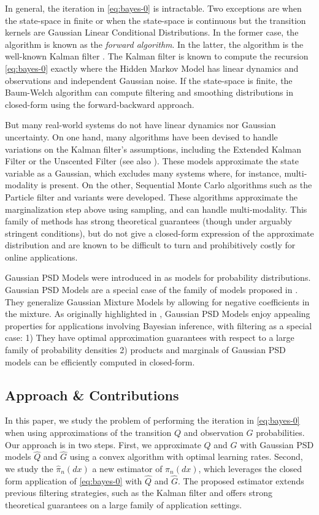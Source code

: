 In general, the iteration in \cref{eq:bayes-0} is intractable. Two exceptions are when the state-space in finite or when the state-space is continuous but the transition kernels are Gaussian Linear Conditional Distributions. In the former case, the algorithm is known as the \textit{forward algorithm}. In the latter, the algorithm is the well-known Kalman filter \cite{kalman-bucy}. The Kalman filter is known to compute the recursion \cref{eq:bayes-0} exactly where the Hidden Markov Model has linear dynamics and observations and independent Gaussian noise.
If the state-space is finite, the Baum-Welch algorithm can compute filtering and smoothing distributions in closed-form using the forward-backward approach.

But many real-world systems do not have linear dynamics nor Gaussian uncertainty. On one hand, many algorithms have been devised to handle variations on the Kalman filter's assumptions, including the Extended Kalman Filter or the Unscented Filter \citep{ukf} (see also \cite{sarkka}). These models approximate the state variable as a Gaussian, which excludes many systems where, for instance, multi-modality is present. On the other, Sequential Monte Carlo algorithms such as the Particle filter and variants were developed. These algorithms approximate the marginalization step above using sampling, and can handle multi-modality. This family of methods has strong theoretical guarantees (though under arguably stringent conditions), but do not give a closed-form expression of the approximate distribution and are known to be difficult to turn and prohibitively costly for online applications.

Gaussian PSD Models were introduced in \cite{ciliberto2021} as models for probability distributions. Gaussian PSD Models are a special case of the family of models proposed in \cite{ulysse-non-negative}. They generalize Gaussian Mixture Models by allowing for negative coefficients in the mixture. As originally highlighted in \cite{ciliberto2021}, Gaussian PSD Models enjoy appealing properties for applications involving Bayesian inference, with filtering as a special case: 1) They have optimal approximation guarantees with respect to a large family of probability densities 2) products and marginals of Gaussian PSD models can be efficiently computed in closed-form.


\subsection*{Approach \& Contributions}
In this paper, we study the problem of performing the iteration in \cref{eq:bayes-0} when using approximations of the transition $Q$ and observation $G$ probabilities. Our approach is in two steps. First, we approximate $Q$ and $G$ with Gaussian PSD models $\hat Q$ and $\hat G$ using a convex algorithm with optimal learning rates. Second, we study the $\hat \pi_n(dx)$ a new estimator of $\pi_n(dx)$, which leverages the closed form application of \cref{eq:bayes-0} with $\hat Q$ and $\hat G$. The proposed estimator extends previous filtering strategies, such as the Kalman filter and offers strong theoretical guarantees on a large family of application settings.

